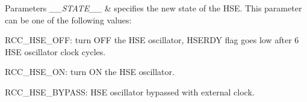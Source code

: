 \begin{DoxyParams}{Parameters}
{\em \+\_\+\+\_\+\+S\+T\+A\+T\+E\+\_\+\+\_\+} & specifies the new state of the H\+SE. This parameter can be one of the following values\+: \begin{DoxyItemize}
\item R\+C\+C\+\_\+\+H\+S\+E\+\_\+\+O\+FF\+: turn O\+FF the H\+SE oscillator, H\+S\+E\+R\+DY flag goes low after 6 H\+SE oscillator clock cycles. \item R\+C\+C\+\_\+\+H\+S\+E\+\_\+\+ON\+: turn ON the H\+SE oscillator. \item R\+C\+C\+\_\+\+H\+S\+E\+\_\+\+B\+Y\+P\+A\+SS\+: H\+SE oscillator bypassed with external clock. \end{DoxyItemize}
\\
\hline
\end{DoxyParams}
